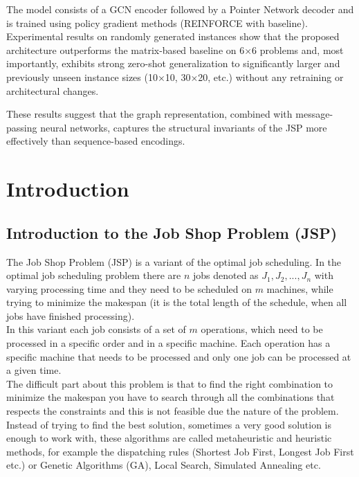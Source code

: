 \documentclass[12pt]{book}
\begin{document}
The model consists of a GCN encoder followed by a Pointer Network decoder and is trained using policy gradient methods (REINFORCE with baseline). Experimental results on randomly generated instances show that the proposed architecture outperforms the matrix-based baseline on 6×6 problems and, most importantly, exhibits strong zero-shot generalization to significantly larger and previously unseen instance sizes (10×10, 30×20, etc.) without any retraining or architectural changes.

These results suggest that the graph representation, combined with message-passing neural networks, captures the structural invariants of the JSP more effectively than sequence-based encodings.




\pagestyle{plain} 
\tableofcontents




\newpage
\pagestyle{fancy}
 
 
 
 
\chapter{Introduction}
\section{Introduction to the Job Shop Problem (JSP)}
The Job Shop Problem (JSP) is a variant of the optimal job scheduling\cite{JSPWikipedia}. In the optimal job scheduling problem there are $n$ jobs denoted as $J_1, J_2, ..., J_n$ with varying processing time and they need to be scheduled on $m$ machines, while trying to minimize the makespan (it is the total length of the schedule, when all jobs have finished processing)\cite{JSPWikipedia}.\\
In this variant each job consists of a set of $m$ operations, which need to be processed in a specific order and in a specific machine. Each operation has a specific machine that needs to be processed and only one job can be processed at a given time.\\
The difficult part about this problem is that to find the right combination to minimize the makespan you have to search through all the combinations that respects the constraints and this is not feasible due the nature of the problem.\\
Instead of trying to find the best solution, sometimes a very good solution is enough to work with, these algorithms are called metaheuristic and heuristic methods, for example the dispatching rules (Shortest Job First, Longest Job First etc.) or Genetic Algorithms (GA), Local Search, Simulated Annealing\cite{Brucker2007} etc.\\
\end{document}
